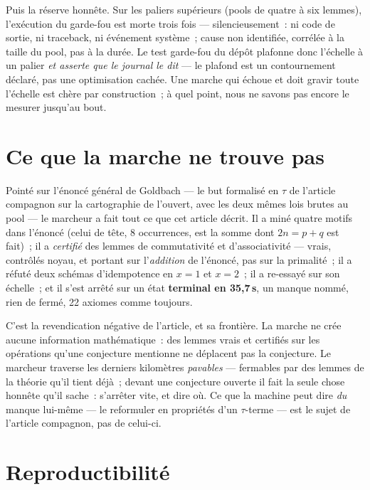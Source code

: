 \documentclass[11pt]{article}
\theoremstyle{remark}\newtheorem{remarque}{Remarque}
\begin{document}
Puis la réserve honnête. Sur les paliers supérieurs (pools de quatre à six
lemmes), l'exécution du garde-fou est morte trois fois --- silencieusement~:
ni code de sortie, ni traceback, ni événement système~; cause non identifiée,
corrélée à la taille du pool, pas à la durée. Le test garde-fou du dépôt
plafonne donc l'échelle à un palier \emph{et asserte que le journal le dit}
--- le plafond est un contournement déclaré, pas une optimisation cachée.
Une marche qui échoue et doit gravir toute l'échelle est chère par
construction~; à quel point, nous ne savons pas encore le mesurer jusqu'au
bout.

\section{Ce que la marche ne trouve pas}
\label{sec:limites-goldbach}

Pointé sur l'énoncé général de Goldbach --- le but formalisé en $\tau$ de
l'article compagnon sur la cartographie de l'ouvert, avec les deux mêmes
lois brutes au pool --- le marcheur a fait tout ce que cet article décrit.
Il a miné quatre motifs dans l'énoncé (celui de tête, 8 occurrences, est
la somme dont $2n = p+q$ est fait)~; il a \emph{certifié} des lemmes de
commutativité et d'associativité --- vrais, contrôlés noyau, et portant
sur l'\emph{addition} de l'énoncé, pas sur la primalité~; il a réfuté
deux schémas d'idempotence en $x=1$ et $x=2$~; il a re-essayé sur son
échelle~; et il s'est arrêté sur un état \textbf{terminal en 35,7\,s}, un manque nommé,
rien de fermé, 22 axiomes comme toujours.

C'est la revendication négative de l'article, et sa frontière. La marche ne
crée aucune information mathématique~: des lemmes vrais et certifiés sur
les opérations qu'une conjecture mentionne ne déplacent pas la conjecture.
Le marcheur traverse les derniers kilomètres \emph{pavables} --- fermables
par des lemmes de la théorie qu'il tient déjà~; devant une conjecture
ouverte il fait la seule chose honnête qu'il sache~: s'arrêter vite, et
dire où. Ce que la machine peut dire \emph{du} manque lui-même --- le
reformuler en propriétés d'un $\tau$-terme --- est le sujet de l'article
compagnon, pas de celui-ci.

\section{Reproductibilité}
\label{sec:repro}
\end{document}
